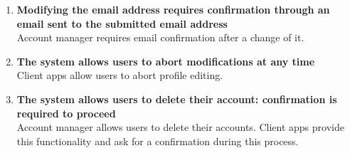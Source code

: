 \begin{enumerate}
	\item \textbf{ Modifying the email address requires confirmation through an email sent to the submitted email address}\\
	Account manager requires email confirmation after a change of it.
	
	\item \textbf{The system allows users to abort modifications at any time}\\
	Client apps allow users to abort profile editing.
	
	\item \textbf{The system allows users to delete their account: confirmation is required	to proceed}\\
	Account manager allows users to delete their accounts. Client apps provide this functionality and ask for a confirmation during this process.	
\end{enumerate}